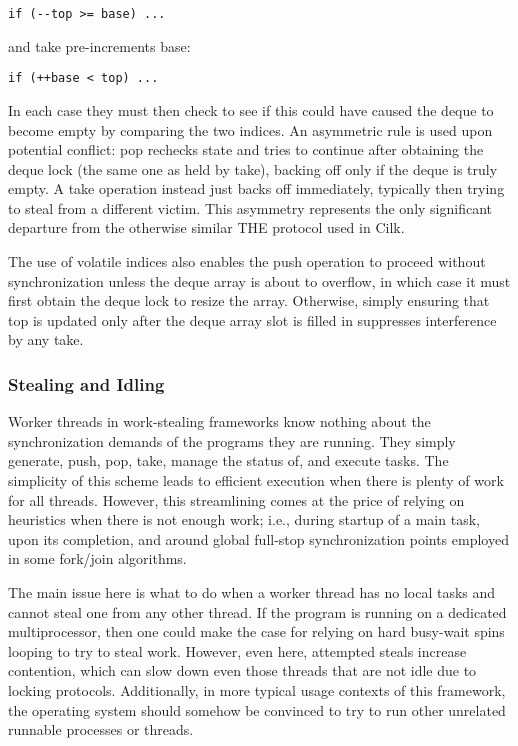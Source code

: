 \begin{lstlisting}
if (--top >= base) ...
\end{lstlisting}

and take pre-increments base:

\begin{lstlisting}
if (++base < top) ...
\end{lstlisting}

In each case they must then check to see if this could have caused the
deque to become empty by comparing the two indices. An asymmetric rule
is used upon potential conflict: pop rechecks state and tries to
continue after obtaining the deque lock (the same one as held by
take), backing off only if the deque is truly empty. A take operation
instead just backs off immediately, typically then trying to steal
from a different victim. This asymmetry represents the only
significant departure from the otherwise similar THE protocol used in
Cilk.

The use of volatile indices also enables the push operation to proceed
without synchronization unless the deque array is about to overflow,
in which case it must first obtain the deque lock to resize the
array. Otherwise, simply ensuring that top is updated only after the
deque array slot is filled in suppresses interference by any take.

\subsubsection{Stealing and Idling}

Worker threads in work-stealing frameworks know nothing about the
synchronization demands of the programs they are running. They simply
generate, push, pop, take, manage the status of, and execute
tasks. The simplicity of this scheme leads to efficient execution when
there is plenty of work for all threads. However, this streamlining
comes at the price of relying on heuristics when there is not enough
work; i.e., during startup of a main task, upon its completion, and
around global full-stop synchronization points employed in some
fork/join algorithms.

The main issue here is what to do when a worker thread has no local
tasks and cannot steal one from any other thread. If the program is
running on a dedicated multiprocessor, then one could make the case
for relying on hard busy-wait spins looping to try to steal
work. However, even here, attempted steals increase contention, which
can slow down even those threads that are not idle due to locking
protocols.  Additionally, in more typical usage contexts of this
framework, the operating system should somehow be convinced to try to
run other unrelated runnable processes or threads.

